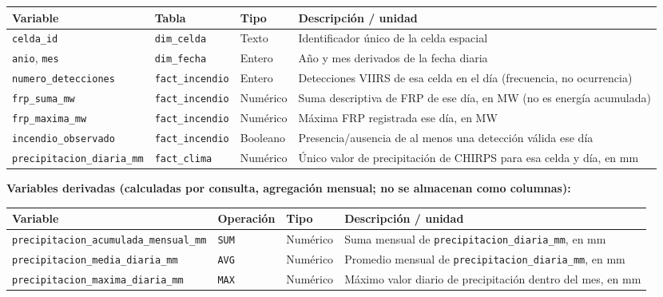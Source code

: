 \documentclass[11pt,a4paper]{article}
\begin{document}
\begin{center}
\footnotesize
\begin{tabular}{@{}L{5.4cm}L{2.1cm}L{1.3cm}L{5.1cm}@{}}
\toprule
\textbf{Variable} & \textbf{Tabla} & \textbf{Tipo} & \textbf{Descripci\'on / unidad} \\
\midrule
\texttt{celda\_id} & \texttt{dim\_celda} & Texto & Identificador \'unico de la celda espacial \\[2pt]
\texttt{anio}, \texttt{mes} & \texttt{dim\_fecha} & Entero & A\~no y mes derivados de la fecha diaria \\[2pt]
\texttt{numero\_detecciones} & \texttt{fact\_incendio} & Entero & Detecciones VIIRS de esa celda en el d\'ia (frecuencia, no ocurrencia) \\[2pt]
\texttt{frp\_suma\_mw} & \texttt{fact\_incendio} & Num\'erico & Suma descriptiva de FRP de ese d\'ia, en MW (no es energ\'ia acumulada) \\[2pt]
\texttt{frp\_maxima\_mw} & \texttt{fact\_incendio} & Num\'erico & M\'axima FRP registrada ese d\'ia, en MW \\[2pt]
\texttt{incendio\_observado} & \texttt{fact\_incendio} & Booleano & Presencia/ausencia de al menos una detecci\'on v\'alida ese d\'ia \\[2pt]
\texttt{precipitacion\_diaria\_mm} & \texttt{fact\_clima} & Num\'erico & \'Unico valor de precipitaci\'on de CHIRPS para esa celda y d\'ia, en mm \\
\bottomrule
\end{tabular}
\end{center}

\vspace{0.2cm}
\noindent\textbf{Variables derivadas (calculadas por consulta, agregaci\'on mensual; no se almacenan como columnas):}

\begin{center}
\footnotesize
\begin{tabular}{@{}L{5.4cm}L{2.1cm}L{1.3cm}L{5.1cm}@{}}
\toprule
\textbf{Variable} & \textbf{Operaci\'on} & \textbf{Tipo} & \textbf{Descripci\'on / unidad} \\
\midrule
\texttt{precipitacion\_acumulada\_\allowbreak mensual\_mm} & \texttt{SUM} & Num\'erico & Suma mensual de \texttt{precipitacion\_diaria\_mm}, en mm \\[2pt]
\texttt{precipitacion\_media\_diaria\_mm} & \texttt{AVG} & Num\'erico & Promedio mensual de \texttt{precipitacion\_diaria\_mm}, en mm \\[2pt]
\texttt{precipitacion\_maxima\_diaria\_mm} & \texttt{MAX} & Num\'erico & M\'aximo valor diario de precipitaci\'on dentro del mes, en mm \\
\bottomrule
\end{tabular}
\end{center}
\end{document}
